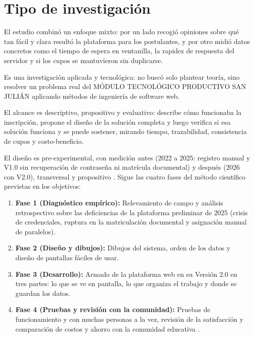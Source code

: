 \section{Tipo de investigación}
\label{sec:tipo_investigacion}

El estudio combinó un enfoque mixto: por un lado recogió opiniones sobre qué tan fácil y clara resultó la plataforma para los postulantes, y por otro midió datos concretos como el tiempo de espera en ventanilla, la rapidez de respuesta del servidor y si los cupos se mantuvieron sin duplicarse.

Es una investigación aplicada y tecnológica: no buscó solo plantear teoría, sino resolver un problema real del MÓDULO TECNOLÓGICO PRODUCTIVO SAN JULIÁN aplicando métodos de ingeniería de software web.

El alcance es descriptivo, propositivo y evaluativo: describe cómo funcionaba la inscripción, propone el diseño de la solución completa y luego verifica si esa solución funciona y se puede sostener, mirando tiempo, trazabilidad, consistencia de cupos y costo-beneficio.

El diseño es pre-experimental, con medición antes (2022 a 2025: registro manual y V1.0 sin recuperación de contraseña ni matrícula documental) y después (2026 con V2.0), transversal y propositivo \parencite{hernandez2014}. Sigue las cuatro fases del método científico previstas en los objetivos:

\begin{enumerate}
    \item \textbf{Fase 1 (Diagnóstico empírico):} Relevamiento de campo y análisis retrospectivo sobre las deficiencias de la plataforma preliminar de 2025 (crisis de credenciales, ruptura en la matriculación documental y asignación manual de paralelos).
    \item \textbf{Fase 2 (Diseño y dibujos):} Dibujos del sistema, orden de los datos y diseño de pantallas fáciles de usar.
    \item \textbf{Fase 3 (Desarrollo):} Armado de la plataforma web en su Versión 2.0 en tres partes: lo que se ve en pantalla, lo que organiza el trabajo y donde se guardan los datos.
    \item \textbf{Fase 4 (Pruebas y revisión con la comunidad):} Pruebas de funcionamiento y con muchas personas a la vez, revisión de la satisfacción y comparación de costos y ahorro con la comunidad educativa \parencite{hernandez2014}.
\end{enumerate}
